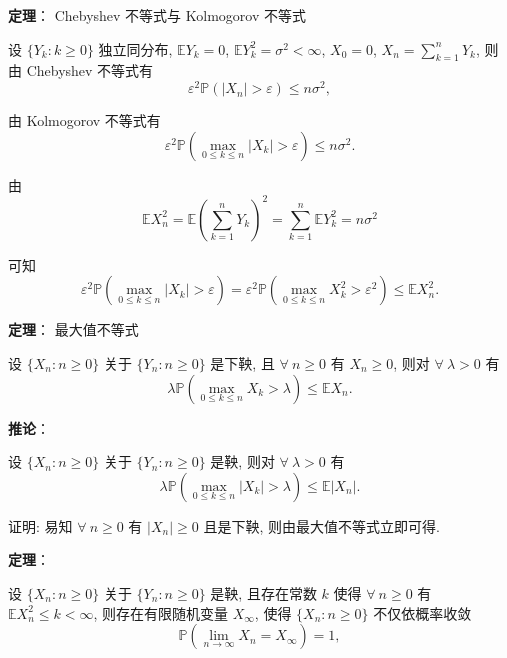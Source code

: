 \documentclass[openany]{ctexbook}
\theoremstyle{kaiti}
\theoremstyle{normal}
\begin{document}
\textbf{定理}： Chebyshev 不等式与 Kolmogorov 不等式

设 $\{Y_k:k\geqslant0\}$ 独立同分布, $\mathbb{E}Y_k=0$, $\mathbb{E}Y_k^2=\sigma^2<\infty$, $X_0=0$, $X_n=\sum_{k=1}^nY_k$, 则由 Chebyshev 不等式有
\begin{equation}
  \varepsilon^2\mathbb{P}(|X_n|>\varepsilon)\leqslant n\sigma^2,
\end{equation}

由 Kolmogorov 不等式有
\begin{equation}
  \varepsilon^2\mathbb{P}\left(\max_{0\leqslant k\leqslant n}|X_k|>\varepsilon\right)\leqslant n\sigma^2.
\end{equation}

由
\begin{equation}
  \mathbb{E}X_n^2=\mathbb{E}\left(\sum_{k=1}^nY_k\right)^2=\sum_{k=1}^n\mathbb{E}Y_k^2=n\sigma^2
\end{equation}

可知
\begin{equation}
  \varepsilon^2\mathbb{P}\left(\max_{0\leqslant k\leqslant n}|X_k|>\varepsilon\right)=\varepsilon^2\mathbb{P}\left(\max_{0\leqslant k\leqslant n}X_k^2>\varepsilon^2\right)\leqslant \mathbb{E}X_n^2.
\end{equation}

\textbf{定理}： 最大值不等式

设 $\{X_n:n\geqslant0\}$ 关于 $\{Y_n:n\geqslant0\}$ 是下鞅, 且 $\forall~n\geqslant0$ 有 $X_n\geqslant0$, 则对 $\forall~\lambda>0$ 有
\begin{equation}
  \lambda \mathbb{P}\left(\max_{0\leqslant k\leqslant n}X_k>\lambda\right)\leqslant \mathbb{E}X_n.
\end{equation}

\textbf{推论}：

设 $\{X_n:n\geqslant0\}$ 关于 $\{Y_n:n\geqslant0\}$ 是鞅, 则对 $\forall~\lambda>0$ 有
\begin{equation}
  \lambda \mathbb{P}\left(\max_{0\leqslant k\leqslant n}|X_k|>\lambda\right)\leqslant \mathbb{E}|X_n|.
\end{equation}

证明: 易知 $\forall~n\geqslant0$ 有 $|X_n|\geqslant0$ 且是下鞅, 则由最大值不等式立即可得.

\textbf{定理}：

设 $\{X_n:n\geqslant0\}$ 关于 $\{Y_n:n\geqslant0\}$ 是鞅, 且存在常数 $k$ 使得 $\forall~n\geqslant0$ 有 $\mathbb{E}X_n^2\leqslant k<\infty$, 则存在有限随机变量 $X_\infty$, 使得 $\{X_n:n\geqslant0\}$ 不仅依概率收敛
\begin{equation}
  \mathbb{P}\left(\lim_{n\to\infty}X_n=X_\infty\right)=1,
\end{equation}
\end{document}
